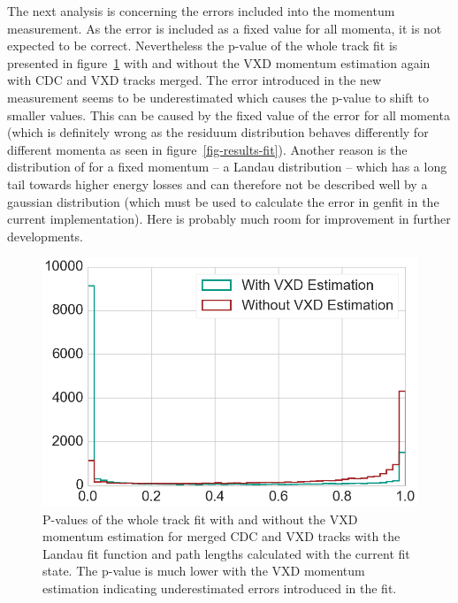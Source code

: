


The next analysis is concerning the errors included into the momentum measurement. As the error is included as a fixed value for all momenta, it is not expected to be correct. Nevertheless the p-value of the whole track fit is presented in figure~\ref{fig-p-values} with and without the VXD momentum estimation again with CDC and VXD tracks merged. The error introduced in the new measurement seems to be underestimated which causes the p-value to shift to smaller values. This can be caused by the fixed value of the error for all momenta (which is definitely wrong as the residuum distribution behaves differently for different momenta as seen in figure~\ref{fig-results-fit}). Another reason is the distribution of \dedx for a fixed momentum -- a Landau distribution -- which has a long tail towards higher energy losses and can therefore not be described well by a gaussian distribution (which must be used to calculate the error in genfit in the current implementation). Here is probably much room for improvement in further developments.

\begin{figure}
  \centering
  \includegraphics[width=0.67\linewidth]{figures/vxd/pValue.png}
  \caption[P-values of the whole track fit]{P-values of the whole track fit with and without the VXD momentum estimation for merged CDC and VXD tracks with the Landau fit function and path lengths calculated with the current fit state. The p-value is much lower with the VXD momentum estimation indicating underestimated errors introduced in the fit.}
  \label{fig-p-values}
\end{figure}

